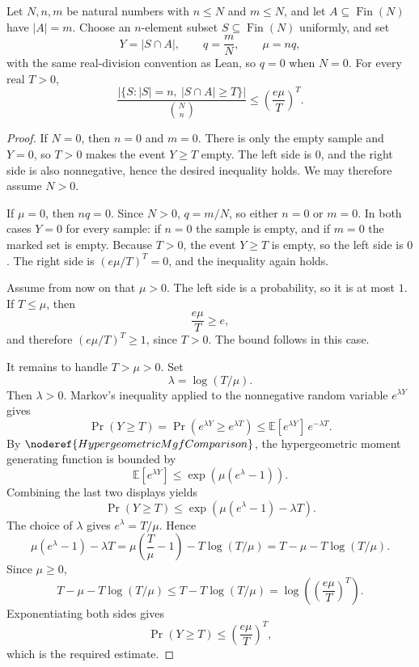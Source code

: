 \begin{helper}[HypergeometricCountingTailBound]
\label{helper:HypergeometricCountingTailBound}
Let \(N,n,m\) be natural numbers with \(n\le N\) and \(m\le N\), and let
\(A\subseteq\operatorname{Fin}(N)\) have \(|A|=m\).  Choose an
\(n\)-element subset \(S\subseteq\operatorname{Fin}(N)\) uniformly, and set
\[
Y=|S\cap A|,\qquad q=\frac mN,\qquad \mu=nq,
\]
with the same real-division convention as Lean, so \(q=0\) when \(N=0\).
For every real \(T>0\),
\[
\frac{\left|\{S: |S|=n,\ |S\cap A|\ge T\}\right|}{\binom Nn}
\le \left(\frac{e\mu}{T}\right)^T .
\]
\end{helper}
\begin{proof}
If \(N=0\), then \(n=0\) and \(m=0\).  There is only the empty sample and
\(Y=0\), so \(T>0\) makes the event \(Y\ge T\) empty.  The left side is
\(0\), and the right side is also nonnegative, hence the desired inequality
holds.  We may therefore assume \(N>0\).

If \(\mu=0\), then \(nq=0\).  Since \(N>0\), \(q=m/N\), so either \(n=0\) or
\(m=0\).  In both cases \(Y=0\) for every sample: if \(n=0\) the sample is
empty, and if \(m=0\) the marked set is empty.  Because \(T>0\), the event
\(Y\ge T\) is empty, so the left side is \(0\).  The right side is
\((e\mu/T)^T=0\), and the inequality again holds.

Assume from now on that \(\mu>0\).  The left side is a probability, so it is
at most \(1\).  If \(T\le\mu\), then
\[
\frac{e\mu}{T}\ge e,
\]
and therefore \((e\mu/T)^T\ge1\), since \(T>0\).  The bound follows in this
case.

It remains to handle \(T>\mu>0\).  Set
\[
\lambda=\log(T/\mu).
\]
Then \(\lambda>0\).  Markov's inequality applied to the nonnegative random
variable \(e^{\lambda Y}\) gives
\[
\Pr(Y\ge T)
=\Pr(e^{\lambda Y}\ge e^{\lambda T})
\le \mathbb E[e^{\lambda Y}]\,e^{-\lambda T}.
\]
By \(\noderef{HypergeometricMgfComparison}\), the hypergeometric moment
generating function is bounded by
\[
\mathbb E[e^{\lambda Y}]
\le \exp(\mu(e^\lambda-1)).
\]
Combining the last two displays yields
\[
\Pr(Y\ge T)
\le \exp(\mu(e^\lambda-1)-\lambda T).
\]
The choice of \(\lambda\) gives \(e^\lambda=T/\mu\).  Hence
\[
\mu(e^\lambda-1)-\lambda T
=\mu\left(\frac T\mu-1\right)-T\log(T/\mu)
=T-\mu-T\log(T/\mu).
\]
Since \(\mu\ge0\),
\[
T-\mu-T\log(T/\mu)
\le T-T\log(T/\mu)
=\log\left(\left(\frac{e\mu}{T}\right)^T\right).
\]
Exponentiating both sides gives
\[
\Pr(Y\ge T)\le \left(\frac{e\mu}{T}\right)^T,
\]
which is the required estimate.
\end{proof}
